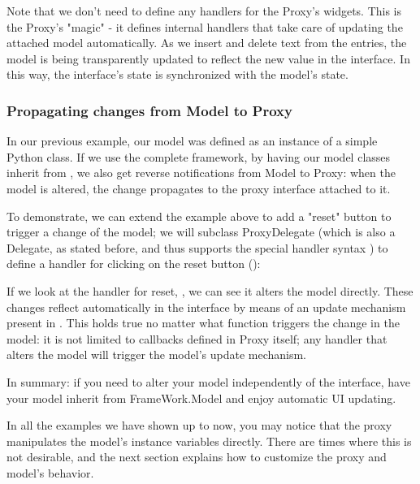 \documentclass[a4paper]{howto}
\begin{document}
Note that we don't need to define any handlers for the Proxy's widgets.
This is the Proxy's "magic" - it defines internal handlers that take
care of updating the attached model automatically. As we insert and
delete text from the entries, the model is being transparently updated
to reflect the new value in the interface. In this way, the interface's
state is synchronized with the model's state.

\subsubsection{Propagating changes from Model to Proxy}

In our previous example, our model was defined as an instance of a
simple Python class. If we use the complete framework, by having our
model classes inherit from , we also get reverse
notifications from Model to Proxy: when the model is altered, the change
propagates to the proxy interface attached to it.

To demonstrate, we can extend the example above to add a "reset" button
to trigger a change of the model; we will subclass ProxyDelegate (which is
also a Delegate, as stated before, and thus supports the special handler
syntax ) to define a handler for clicking on the reset
button ():



If we look at the handler for reset, , we
can see it alters the model directly. These changes reflect
automatically in the interface by means of an update mechanism present
in . This holds true no matter what function
triggers the change in the model: it is not limited to callbacks defined
in Proxy itself; any handler that alters the model will trigger the
model's update mechanism.

In summary: if you need to alter your model independently of the
interface, have your model inherit from FrameWork.Model and enjoy
automatic UI updating.

In all the examples we have shown up to now, you may notice that the
proxy manipulates the model's instance variables directly. There are
times where this is not desirable, and the next section explains how to
customize the proxy and model's behavior.
\end{document}
